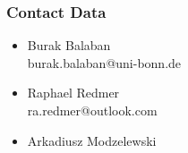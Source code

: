 \begin{frame}
    \frametitle{Contact Data}
    \begin{itemize}
        \item Burak Balaban\\
        \quad \quad burak.balaban@uni-bonn.de
        \smallbreak
        \item Raphael Redmer\\
        \quad \quad ra.redmer@outlook.com
        \smallbreak
        \item Arkadiusz Modzelewski\\
        \quad \quad
    \end{itemize}
\end{frame}
    
